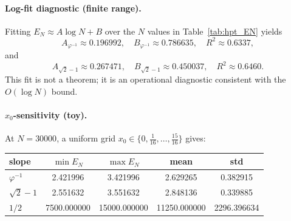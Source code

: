 \paragraph{Log-fit diagnostic (finite range).}
Fitting $E_N\approx A\log N+B$ over the $N$ values in Table~\ref{tab:hpt_EN} yields
\begin{equation}
A_{\varphi^{-1}}\approx 0.196992,\quad B_{\varphi^{-1}}\approx 0.786635,\quad R^2\approx 0.6337,
\end{equation}
and
\begin{equation}
A_{\sqrt2-1}\approx 0.267471,\quad B_{\sqrt2-1}\approx 0.450037,\quad R^2\approx 0.6460.
\end{equation}
This fit is not a theorem; it is an operational diagnostic consistent with the $O(\log N)$ bound.

\paragraph{$x_0$-sensitivity (toy).}
At $N=30000$, a uniform grid $x_0\in\{0,\tfrac{1}{16},\dots,\tfrac{15}{16}\}$ gives:
\begin{center}
\begin{tabular}{@{}lcccc@{}}
\toprule
slope & $\min E_N$ & $\max E_N$ & mean & std \\
\midrule
$\varphi^{-1}$ & 2.421996 & 3.421996 & 2.629265 & 0.382915 \\
$\sqrt2-1$ & 2.551632 & 3.551632 & 2.848136 & 0.339885 \\
$1/2$ & 7500.000000 & 15000.000000 & 11250.000000 & 2296.396634 \\
\bottomrule
\end{tabular}
\end{center}


